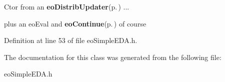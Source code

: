 Ctor from an {\bf eo\-Distrib\-Updater}{\rm (p.\,\pageref{classeo_distrib_updater})} ... 

plus an eo\-Eval and {\bf eo\-Continue}{\rm (p.\,\pageref{classeo_continue})} of course 

Definition at line 53 of file eo\-Simple\-EDA.h.

The documentation for this class was generated from the following file:\begin{CompactItemize}
\item 
eo\-Simple\-EDA.h\end{CompactItemize}

